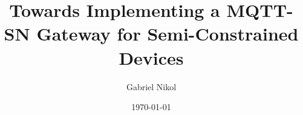 \author[Initials]{Gabriel Nikol}
\title{Towards Implementing a MQTT-SN Gateway for Semi-Constrained Devices}
\subtitle{}
\date{\today}

\subject{subject}

\institute[KTR]{\chair\\ \chairsub}


\gittrue
\presentationtrue

